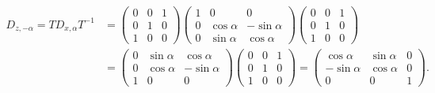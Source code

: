 \begin{align*}
D_{z,-\alpha}=TD_{x,\alpha}T^{-1}
&=
\begin{pmatrix}
0&0&1\\
0&1&0\\
1&0&0
\end{pmatrix}
\begin{pmatrix}
1&0&0\\
0&\cos\alpha&-\sin\alpha\\
0&\sin\alpha&\cos\alpha
\end{pmatrix}
\begin{pmatrix}
0&0&1\\
0&1&0\\
1&0&0
\end{pmatrix}
\\
&=
\begin{pmatrix}
0&\sin\alpha&\cos\alpha\\
0&\cos\alpha&-\sin\alpha\\
1&0&0
\end{pmatrix}
\begin{pmatrix}
0&0&1\\
0&1&0\\
1&0&0
\end{pmatrix}
=
\begin{pmatrix}
\cos\alpha&\sin\alpha&0\\
-\sin\alpha&\cos\alpha&0\\
0&0&1
\end{pmatrix}.
\end{align*}
